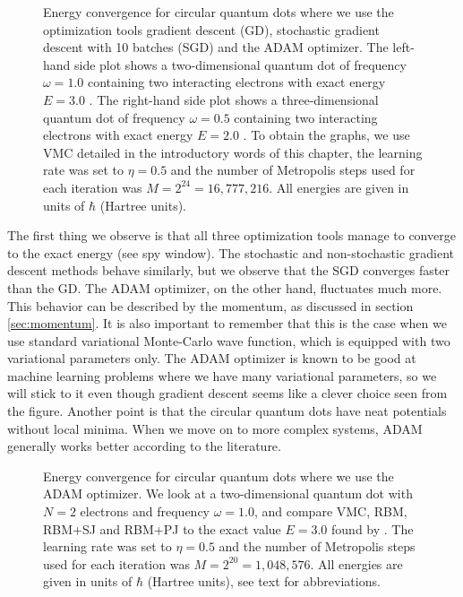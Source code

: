 \begin{figure}
	\centering 
	\subfloat{{}}
	\caption{Energy convergence for circular quantum dots where we use the optimization tools gradient descent (GD), stochastic gradient descent with 10 batches (SGD) and the ADAM optimizer. The left-hand side plot shows a two-dimensional quantum dot of frequency $\omega=1.0$ containing two interacting electrons with exact energy $E=3.0$ \cite{taut_two_1993}. The right-hand side plot shows a three-dimensional quantum dot of frequency $\omega=0.5$ containing two interacting electrons with exact energy $E=2.0$ \cite{taut_two_1994}. To obtain the graphs, we use VMC detailed in the introductory words of this chapter, the learning rate was set to $\eta=0.5$ and the number of Metropolis steps used for each iteration was $M=2^{24}=16,777,216$. All energies are given in units of $\hbar$ (Hartree units).}
	\label{fig:convergenceoptimization}
\end{figure} 

The first thing we observe is that all three optimization tools manage to converge to the exact energy (see spy window). The stochastic and non-stochastic gradient descent methods behave similarly, but we observe that the SGD converges faster than the GD. The ADAM optimizer, on the other hand, fluctuates much more. This behavior can be described by the momentum, as discussed in section \ref{sec:momentum}. It is also important to remember that this is the case when we use standard variational Monte-Carlo wave function, which is equipped with two variational parameters only. The ADAM optimizer is known to be good at machine learning problems where we have many variational parameters, so we will stick to it even though gradient descent seems like a clever choice seen from the figure. Another point is that the circular quantum dots have neat potentials without local minima. When we move on to more complex systems, ADAM generally works better according to the literature.

\begin{figure}
	\centering 
	\subfloat{{}}
	\caption{Energy convergence for circular quantum dots where we use the ADAM optimizer. We look at a two-dimensional quantum dot with $N=2$ electrons and frequency $\omega=1.0$, and compare VMC, RBM, RBM+SJ and RBM+PJ to the exact value $E=3.0$ found by \citet{taut_two_1993}. The learning rate was set to $\eta=0.5$ and the number of Metropolis steps used for each iteration was $M=2^{20}=1,048,576$. All energies are given in units of $\hbar$ (Hartree units), see text for abbreviations.}
	\label{fig:convergence42}
\end{figure} 


